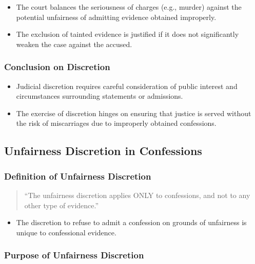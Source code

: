 \begin{itemize}
\tightlist
\item
  The court balances the seriousness of charges (e.g., murder) against
  the potential unfairness of admitting evidence obtained improperly.
\item
  The exclusion of tainted evidence is justified if it does not
  significantly weaken the case against the accused.
\end{itemize}

\subsubsection{Conclusion on Discretion}\label{conclusion-on-discretion}

\begin{itemize}
\tightlist
\item
  Judicial discretion requires careful consideration of public interest
  and circumstances surrounding statements or admissions.
\item
  The exercise of discretion hinges on ensuring that justice is served
  without the risk of miscarriages due to improperly obtained
  confessions.
\end{itemize}

\subsection{  Unfairness Discretion in
Confessions}\label{unfairness-discretion-in-confessions}

\subsubsection{Definition of Unfairness
Discretion}\label{definition-of-unfairness-discretion}

\begin{quote}
``The unfairness discretion applies ONLY to confessions, and not to any
other type of evidence.''
\end{quote}

\begin{itemize}
\tightlist
\item
  The discretion to refuse to admit a confession on grounds of
  unfairness is unique to confessional evidence.
\end{itemize}

\subsubsection{Purpose of Unfairness
Discretion}\label{purpose-of-unfairness-discretion}

